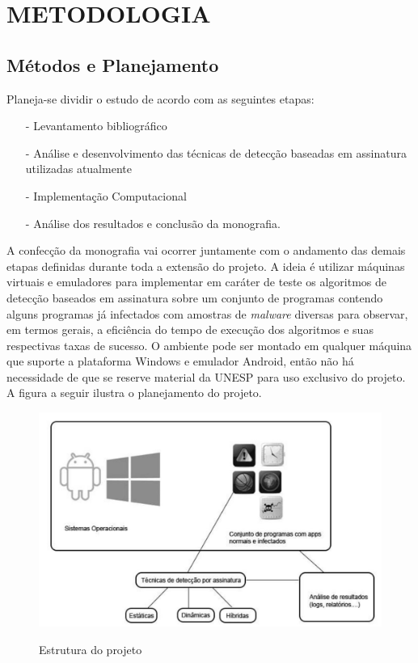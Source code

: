 \chapter{METODOLOGIA}
\label{c.metodologia}

\section{Métodos e Planejamento}
\label{s.metodoseplan}

Planeja-se dividir o estudo de acordo com as seguintes etapas:

\begin{itemize}
	\item[-] Levantamento bibliográfico
	\item[-] Análise e desenvolvimento das técnicas de detecção baseadas em assinatura utilizadas atualmente
	\item[-] Implementação Computacional
	\item[-] Análise dos resultados e conclusão da monografia.
\end{itemize}
A confecção da monografia vai ocorrer juntamente com o andamento das demais
etapas definidas durante toda a extensão do projeto. A ideia é utilizar
máquinas virtuais e emuladores para implementar em caráter de teste os
algoritmos de detecção baseados em assinatura sobre um conjunto de programas
contendo alguns programas já infectados com amostras de \textit{malware} diversas para
observar, em termos gerais, a eficiência do tempo de execução dos algoritmos e
suas respectivas taxas de sucesso. O ambiente pode ser montado em qualquer
máquina que suporte a plataforma Windows e emulador Android, então não há
necessidade de que se reserve material da UNESP para uso exclusivo do projeto.
A figura a seguir ilustra o planejamento do projeto.
\begin{figure}[H]
\caption{\small Estrutura do projeto}
\centering
\includegraphics[scale=0.4]{figs/fig2}
\label{f.estrutura_projeto}
\end{figure}

